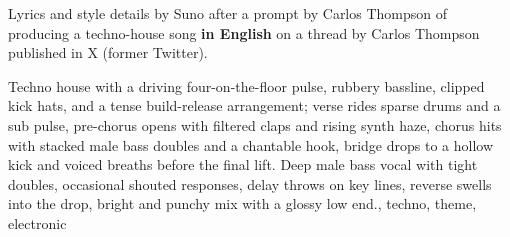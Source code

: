

\begin{notes}
Lyrics and style details by Suno after a prompt by Carlos Thompson of producing a techno-house song \textbf{in English} on a thread by Carlos Thompson published in X (former Twitter).
\end{notes}

\begin{style}
Techno house with a driving four-on-the-floor pulse, rubbery bassline, clipped kick hats, and a tense build-release arrangement; verse rides sparse drums and a sub pulse, pre-chorus opens with filtered claps and rising synth haze, chorus hits with stacked male bass doubles and a chantable hook, bridge drops to a hollow kick and voiced breaths before the final lift. %
Deep male bass vocal with tight doubles, occasional shouted responses, delay throws on key lines, reverse swells into the drop, bright and punchy mix with a glossy low end., techno, theme, electronic
\end{style}

